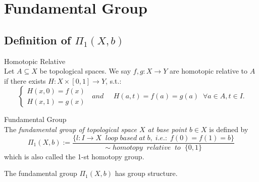 \chapter{Fundamental Group}

\section{Definition of $\Pi_1 (X,b)$}

\begin{definition}{Homotopic Relative}\\
Let $A \subseteq X$ be topological spaces. We say $f,g : X \rightarrow Y$ are homotopic relative to $A$ if there exists $H : X \times [0,1] \rightarrow Y$, s.t.:
$$\begin{cases}
    H(x,0) = f(x)\\
    H(x,1) = g(x)
\end{cases} \;\; and \;\;\;\;\; H(a,t) = f(a) = g(a) \;\;\forall a \in A,t\in I.$$
\end{definition}

\begin{definition}{Fundamental Group}\\
The \textit{fundamental group of topological space $X$ at base point $b \in X$} is defined by
$$\Pi_1 (X,b) := \frac{\{ l : I \rightarrow X \;\;loop\;based\;at\;b,\;i.e.:\;f(0)=f(1)=b \} } {\sim \;homotopy\;\;relative\;\;to\;\; \{0,1 \}}$$
which is also called the 1-st homotopy group.
\end{definition}

\begin{proposition}
    The fundamental group $\Pi_1 (X,b)$ has group structure.
\end{proposition}

